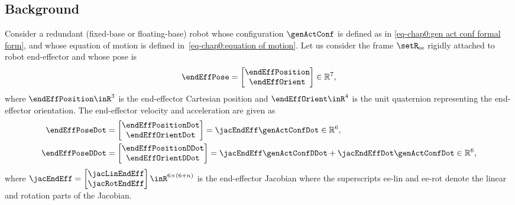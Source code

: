 \subsection{Background}
Consider a redundant (fixed-base or floating-base) robot whose configuration $\genActConf$ is defined as in \cref{eq-chap0:gen act conf formal form}, and whose equation of motion is defined in~\cref{eq-chap0:equation of motion}.
Let us consider the frame $\setR_{\rm ee}$ rigidly attached to robot end-effector and whose pose is   
\begin{equation}\label{eq:end-effector pose}
	\endEffPose=\begin{bmatrix}
		\endEffPosition \\ \endEffOrient
	\end{bmatrix}\in \mathbb{R}^7,
\end{equation}
where $\endEffPosition\inR^{3}$ is the end-effector Cartesian position and $\endEffOrient\inR^4$ is the unit quaternion representing the end-effector orientation.
The end-effector velocity and acceleration are given as 
\begin{align}\label{eq:end-effector vel and acc}
	\endEffPoseDot&=\begin{bmatrix}
		\endEffPositionDot \\ \endEffOrientDot
	\end{bmatrix} = \jacEndEff\genActConfDot\in \mathbb{R}^6, \\
	\endEffPoseDDot&=\begin{bmatrix}
		\endEffPositionDDot \\ \endEffOrientDDot
	\end{bmatrix} = \jacEndEff\genActConfDDot + \jacEndEffDot\genActConfDot\in \mathbb{R}^6,
\end{align}
where $ \jacEndEff = \begin{bmatrix}
	\jacLinEndEff \\\jacRotEndEff
\end{bmatrix}\inR^{6\times(6+n)}$ is the end-effector Jacobian where the superscripts $\textrm{ee-lin}$ and $\textrm{ee-rot}$ denote the linear and rotation parts of the Jacobian.
